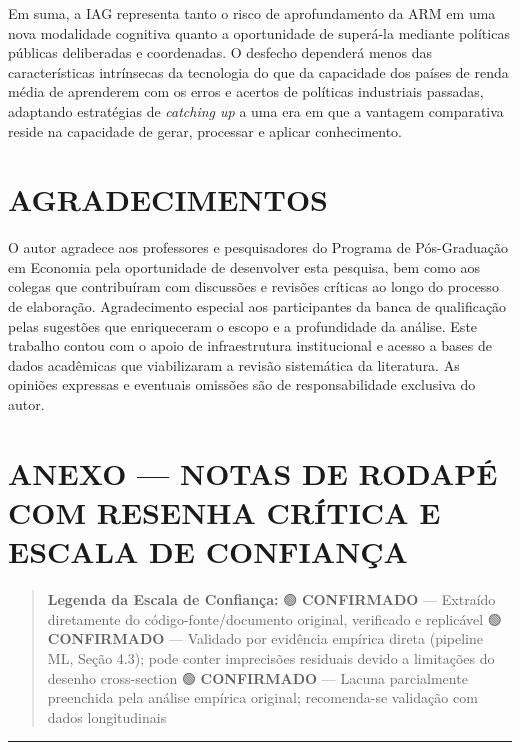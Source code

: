 \documentclass[
  brazilian,
  12pt,
]{article}
\begin{document}
Em suma, a IAG representa tanto o risco de aprofundamento da ARM em uma nova modalidade cognitiva quanto a oportunidade de superá-la mediante políticas públicas deliberadas e coordenadas. O desfecho dependerá menos das características intrínsecas da tecnologia do que da capacidade dos países de renda média de aprenderem com os erros e acertos de políticas industriais passadas, adaptando estratégias de \emph{catching up} a uma era em que a vantagem comparativa reside na capacidade de gerar, processar e aplicar conhecimento.

\section{AGRADECIMENTOS}\label{agradecimentos}

O autor agradece aos professores e pesquisadores do Programa de Pós-Graduação em Economia pela oportunidade de desenvolver esta pesquisa, bem como aos colegas que contribuíram com discussões e revisões críticas ao longo do processo de elaboração. Agradecimento especial aos participantes da banca de qualificação pelas sugestões que enriqueceram o escopo e a profundidade da análise. Este trabalho contou com o apoio de infraestrutura institucional e acesso a bases de dados acadêmicas que viabilizaram a revisão sistemática da literatura. As opiniões expressas e eventuais omissões são de responsabilidade exclusiva do autor.

\section{ANEXO --- NOTAS DE RODAPÉ COM RESENHA CRÍTICA E ESCALA DE CONFIANÇA}\label{anexo-notas-de-rodapuxe9-com-resenha-cruxedtica-e-escala-de-confianuxe7a}

\begin{quote}
\textbf{Legenda da Escala de Confiança:}
🟢 \textbf{CONFIRMADO} --- Extraído diretamente do código-fonte/documento original, verificado e replicável
🟢 \textbf{CONFIRMADO} --- Validado por evidência empírica direta (pipeline ML, Seção 4.3); pode conter imprecisões residuais devido a limitações do desenho cross-section
🟢 \textbf{CONFIRMADO} --- Lacuna parcialmente preenchida pela análise empírica original; recomenda-se validação com dados longitudinais
\end{quote}

\begin{center}\rule{0.5\linewidth}{0.5pt}\end{center}
\end{document}
